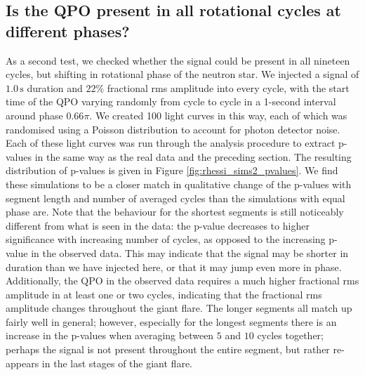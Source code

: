 \documentclass{emulateapj}
\begin{document}
 
\subsection{Is the QPO present in all rotational cycles at different phases?}

As a second test, we checked whether the signal could be present in all nineteen cycles, but shifting in rotational phase of the neutron star. We injected a signal of $1.0\, \mathrm{s}$ duration and $22\%$ fractional rms amplitude into every cycle, with the start time of the QPO varying randomly from cycle to cycle in a 1-second interval around phase $0.66\pi$. We created 100 light curves in this way, each of which was randomised using a Poisson distribution to account for photon detector noise. Each of these light curves was run through the analysis procedure to extract p-values in the same way as the real data and the preceding section. 
The resulting distribution of p-values is given in Figure \ref{fig:rhessi_sims2_pvalues}. We find these simulations to be a closer match in qualitative change of the p-values with segment length and number of averaged cycles than the simulations with equal phase are. Note that the behaviour for the shortest segments is still noticeably different from what is seen in the data: the p-value decreases to higher significance with increasing number of cycles, as opposed to the increasing p-value in the observed data. This may indicate that the signal may be shorter in duration than we have injected here, or that it may jump even more in phase. Additionally, the QPO in the observed data requires a much higher fractional rms amplitude in at least one or two cycles, indicating that the fractional rms amplitude changes throughout the giant flare.
The longer segments all match up fairly well in general; however, especially for the longest segments there is an increase in the p-values when averaging between $5$ and $10$ cycles together; perhaps the signal is not present throughout the entire segment, but rather re-appears in the last stages of the giant flare.
\end{document}
